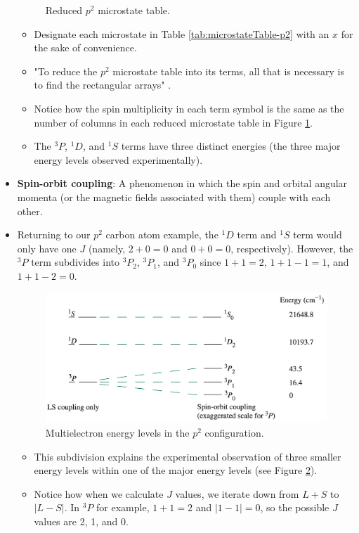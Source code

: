 \documentclass[../notes.tex]{subfiles}
\begin{document}
\begin{itemize}
\begin{figure}[h!]
        \caption{Reduced $p^2$ microstate table.}
        \label{fig:microstateTable-p2-reduced}
    \end{figure}
    \begin{itemize}
        \item Designate each microstate in Table \ref{tab:microstateTable-p2} with an $x$ for the sake of convenience.
        \item "To reduce the $p^2$ microstate table into its terms, all that is necessary is to find the rectangular arrays" \parencite[410]{bib:MiesslerFischerTarr}.
        \item Notice how the spin multiplicity in each term symbol is the same as the number of columns in each reduced microstate table in Figure \ref{fig:microstateTable-p2-reduced}.
        \item The ${}^3P$, ${}^1D$, and ${}^1S$ terms have three distinct energies (the three major energy levels observed experimentally).
    \end{itemize}
    \item \textbf{Spin-orbit coupling}: A phenomenon in which the spin and orbital angular momenta (or the magnetic fields associated with them) couple with each other.
    \item Returning to our $p^2$ carbon atom example, the ${}^1D$ term and ${}^1S$ term would only have one $J$ (namely, $2+0=0$ and $0+0=0$, respectively). However, the ${}^3P$ term subdivides into ${}^3P_2$, ${}^3P_1$, and ${}^3P_0$ since $1+1=2$, $1+1-1=1$, and $1+1-2=0$.
    \begin{figure}[h!]
        \centering
        \includegraphics[width=0.6\linewidth]{../ExtFiles/multielectronStates-p2.png}
        \caption{Multielectron energy levels in the $p^2$ configuration.}
        \label{fig:multielectronStates-p2}
    \end{figure}
    \begin{itemize}
        \item This subdivision explains the experimental observation of three smaller energy levels within one of the major energy levels (see Figure \ref{fig:multielectronStates-p2}).
        \item Notice how when we calculate $J$ values, we iterate down from $L+S$ to $|L-S|$. In ${}^3P$ for example, $1+1=2$ and $|1-1|=0$, so the possible $J$ values are 2, 1, and 0.

\end{itemize}
\end{itemize}
\end{document}
